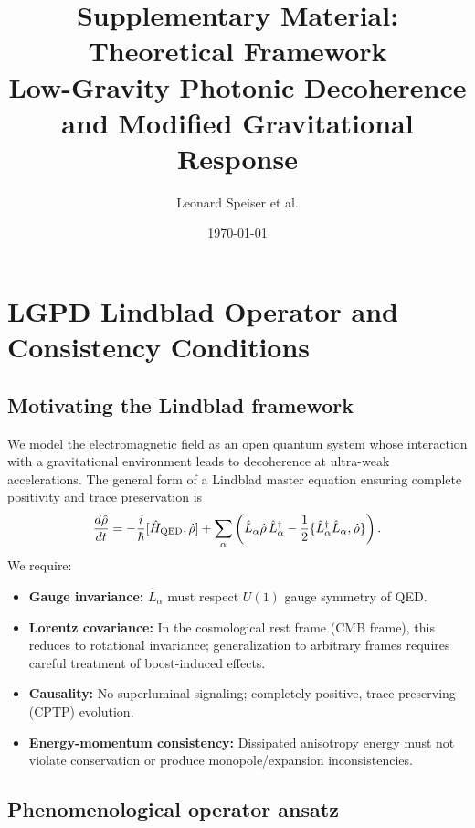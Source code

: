 \documentclass[11pt]{article}
\title{Supplementary Material: Theoretical Framework\\
Low-Gravity Photonic Decoherence and Modified Gravitational Response}
\author{Leonard Speiser et al.}
\date{\today}
\begin{document}
\maketitle

\section{LGPD Lindblad Operator and Consistency Conditions}

\subsection{Motivating the Lindblad framework}

We model the electromagnetic field as an open quantum system whose interaction with a gravitational environment leads to decoherence at ultra-weak accelerations.
The general form of a Lindblad master equation ensuring complete positivity and trace preservation is
\begin{equation}
\frac{d\hat{\rho}}{dt} = -\frac{i}{\hbar}[\hat{H}_{\rm QED}, \hat{\rho}]
+ \sum_\alpha \left(\hat{L}_\alpha \hat{\rho}\,\hat{L}_\alpha^\dagger 
- \frac{1}{2}\{\hat{L}_\alpha^\dagger \hat{L}_\alpha, \hat{\rho}\}\right).
\label{eq:lindblad}
\end{equation}
We require:
\begin{itemize}
  \item \textbf{Gauge invariance:} $\hat{L}_\alpha$ must respect $U(1)$ gauge symmetry of QED.
  \item \textbf{Lorentz covariance:} In the cosmological rest frame (CMB frame), this reduces to rotational invariance; generalization to arbitrary frames requires careful treatment of boost-induced effects.
  \item \textbf{Causality:} No superluminal signaling; completely positive, trace-preserving (CPTP) evolution.
  \item \textbf{Energy-momentum consistency:} Dissipated anisotropy energy must not violate conservation or produce monopole/expansion inconsistencies.
\end{itemize}

\subsection{Phenomenological operator ansatz}
\end{document}
